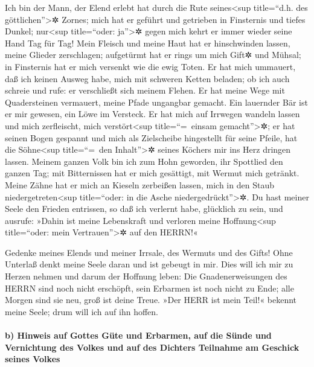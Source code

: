Ich bin der Mann, der Elend erlebt hat durch die Rute
seines\textless sup title=``d.h. des göttlichen''\textgreater✲ Zornes;
mich hat er geführt und getrieben in Finsternis und tiefes
Dunkel; nur\textless sup title=``oder: ja''\textgreater✲
gegen mich kehrt er immer wieder seine Hand Tag für Tag!
Mein Fleisch und meine Haut hat er hinschwinden lassen,
meine Glieder zerschlagen; aufgetürmt hat er rings um mich
Gift✲ und Mühsal; in Finsternis hat er mich versenkt wie
die ewig Toten. Er hat mich ummauert, daß ich keinen
Ausweg habe, mich mit schweren Ketten beladen; ob ich auch
schreie und rufe: er verschließt sich meinem Flehen. Er
hat meine Wege mit Quadersteinen vermauert, meine Pfade ungangbar
gemacht. Ein lauernder Bär ist er mir gewesen, ein Löwe
im Versteck. Er hat mich auf Irrwegen wandeln lassen und
mich zerfleischt, mich verstört\textless sup title=``=~einsam
gemacht''\textgreater✲; er hat seinen Bogen gespannt und
mich als Zielscheibe hingestellt für seine Pfeile, hat
die Söhne\textless sup title=``=~den Inhalt''\textgreater✲ seines
Köchers mir ins Herz dringen lassen. Meinem ganzen Volk
bin ich zum Hohn geworden, ihr Spottlied den ganzen Tag;
mit Bitternissen hat er mich gesättigt, mit Wermut mich
getränkt. Meine Zähne hat er mich an Kieseln zerbeißen
lassen, mich in den Staub niedergetreten\textless sup title=``oder: in
die Asche niedergedrückt''\textgreater✲. Du hast meiner
Seele den Frieden entrissen, so daß ich verlernt habe, glücklich zu
sein, und ausrufe: »Dahin ist meine Lebenskraft und
verloren meine Hoffnung\textless sup title=``oder: mein
Vertrauen''\textgreater✲ auf den HERRN!«

Gedenke meines Elends und meiner Irrsale, des Wermuts und
des Gifts! Ohne Unterlaß denkt meine Seele daran und ist
gebeugt in mir. Dies will ich mir zu Herzen nehmen und
darum der Hoffnung leben: Die Gnadenerweisungen des HERRN
sind noch nicht erschöpft, sein Erbarmen ist noch nicht zu Ende;
alle Morgen sind sie neu, groß ist deine Treue.
»Der HERR ist mein Teil!« bekennt meine Seele; drum will
ich auf ihn hoffen.

\hypertarget{b-hinweis-auf-gottes-guxfcte-und-erbarmen-auf-die-suxfcnde-und-vernichtung-des-volkes-und-auf-des-dichters-teilnahme-am-geschick-seines-volkes}{%
\paragraph{b) Hinweis auf Gottes Güte und Erbarmen, auf die Sünde und
Vernichtung des Volkes und auf des Dichters Teilnahme am Geschick seines
Volkes}\label{b-hinweis-auf-gottes-guxfcte-und-erbarmen-auf-die-suxfcnde-und-vernichtung-des-volkes-und-auf-des-dichters-teilnahme-am-geschick-seines-volkes}}

